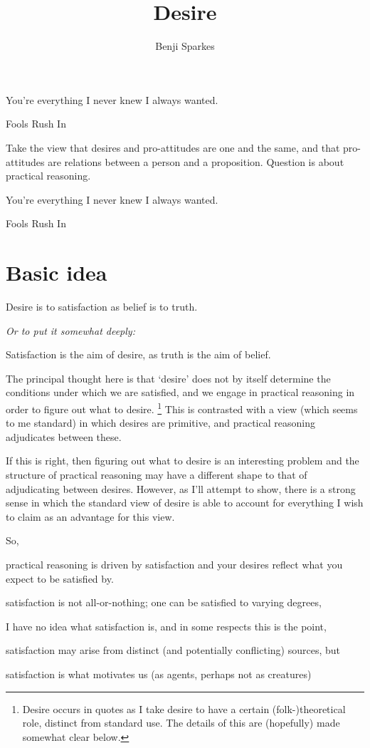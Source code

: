 \documentclass[10pt]{article}
\title{Desire}
\author{Benji Sparkes}
\begin{document}
\maketitle
\epigraph{You're everything I never knew I always wanted.}{Fools Rush In}


Take the view that desires and pro-attitudes are one and the same, and that pro-attitudes are relations between a person and a proposition.
Question is about practical reasoning.




\newpage

\maketitle
\epigraph{You're everything I never knew I always wanted.}{Fools Rush In}



\section{Basic idea}
\label{sec:basic-idea}


\begin{center}
  Desire is to satisfaction as belief is to truth.

  \emph{Or to put it somewhat deeply:}

  Satisfaction is the aim of desire, as truth is the aim of belief.
\end{center}

The principal thought here is that `desire' does not by itself determine the conditions under which we are satisfied, and we engage in practical reasoning in order to figure out what to desire.\nolinebreak
\footnote{Desire occurs in quotes as I take desire to have a certain (folk-)theoretical role, distinct from standard use.
  The details of this are (hopefully) made somewhat clear below.}
This is contrasted with a view (which seems to me standard) in which desires are primitive, and practical reasoning adjudicates between these.

If this is right, then figuring out what to desire is an interesting problem and the structure of practical reasoning may have a different shape to that of adjudicating between desires.
However, as I'll attempt to show, there is a strong sense in which the standard view of desire is able to account for everything I wish to claim as an advantage for this view.

So, \nolinebreak
\begin{enumerate*}[label=\alph*)]
\item practical reasoning is driven by satisfaction and your desires reflect what you expect to be satisfied by.
\item satisfaction is not all-or-nothing; one can be satisfied to varying degrees,
\item I have no idea what satisfaction is, and in some respects this is the point,
\item satisfaction may arise from distinct (and potentially conflicting) sources, but
\item satisfaction is what motivates us (as agents, perhaps not as creatures)
\end{enumerate*}
\end{document}
